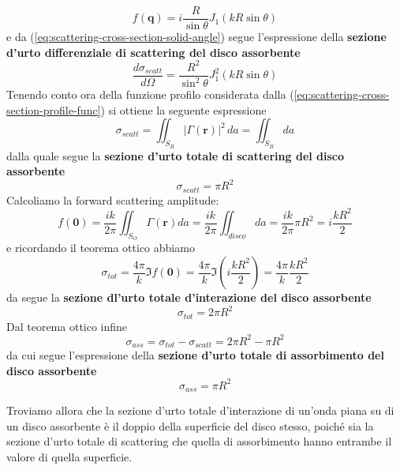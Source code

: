 \begin{equation}
	f(\bm{q}) = i \frac{R}{\sin \theta} J_1(kR \sin \theta)
	\label{eq:scattering-amplitude-bessel-one}
\end{equation}
e da (\ref{eq:scattering-cross-section-solid-angle}) segue l'espressione della \textbf{sezione d'urto differenziale di
scattering del disco assorbente}
\begin{equation}
	\frac{d \sigma_{scatt}}{d \Omega} = \frac{{R}^{2}}{\sin^2 \theta} J_1^2(kR \sin \theta)
    \label{eq:scattering-differential-cross-section-absorptive-disk}
\end{equation}
Tenendo conto ora della funzione profilo considerata dalla (\ref{eq:scattering-cross-section-profile-func}) si ottiene
la seguente espressione
\[
	\sigma_{scatt} = \iint_{S_B} |\Gamma(\bm{r})|^2 \, da = \iint_{S_B} da
\]
dalla quale segue la \textbf{sezione d'urto totale di scattering del disco assorbente}
\begin{equation}
	\sigma_{scatt} = \pi R^2
	\label{eq:total-scattering-cross-section-absorptive-disk}
\end{equation}
Calcoliamo la forward scattering amplitude:
\[
	f(\bm{0}) = \frac{ik}{2 \pi} \iint_{S_O} \Gamma (\bm{r}) da = \frac{ik}{2 \pi} \iint_{disco} da = \frac{ik}{2 \pi}
	\pi R^2 = i \frac{kR^2}{2}
\] e ricordando il teorema ottico abbiamo
\[
	\sigma_{tot} = \frac{4 \pi}{k} \Im f(\bm{0}) = \frac{4 \pi}{k} \Im \left(i  \frac{kR^2}{2}\right) = \frac{4 \pi}{k}\frac{kR^2}{2}
\]
da segue la \textbf{sezione dl'urto totale d'interazione del disco assorbente}
\begin{equation}
	\sigma_{tot} = 2 \pi R^2
	\label{eq:total-interaction-cross-section-absorptive-disk}
\end{equation}
Dal teorema ottico infine
\[
	\sigma_{ass} = \sigma_{tot} - \sigma_{scatt} = 2\pi R^2 - \pi R^2
\]
da cui segue l'espressione della \textbf{sezione d'urto totale di
assorbimento del disco assorbente}
\begin{equation}
	\sigma_{ass} = \pi R^2
	\label{eq:absorptive-cross-section-absorptive-disk}
\end{equation}

Troviamo allora che la sezione d'urto totale d'interazione di un'onda
piana su di un disco assorbente è il doppio della superficie del disco
stesso, poiché sia la sezione d'urto totale di scattering che quella di
assorbimento hanno entrambe il valore di quella superficie.
